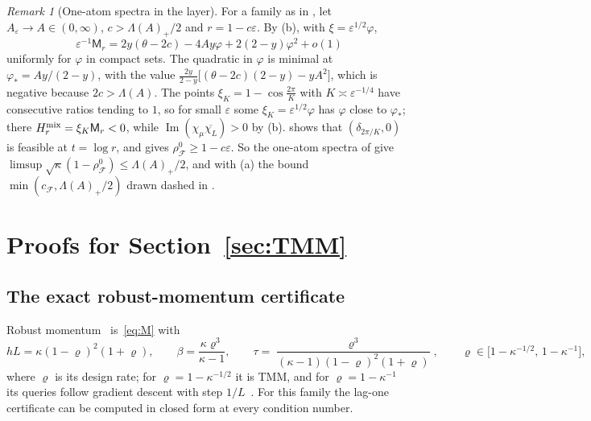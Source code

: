 \documentclass[11pt]{article}
\theoremstyle{definition}
\theoremstyle{remark}
\newtheorem{remark}[theorem]{Remark}
\newcommand{\cF}{\mathcal F}
\newcommand{\Ima}{\operatorname{Im}}
\newcommand{\rhoz}{\rho_{\cF}^{0}}
\newcommand{\cFF}{c_{\cF}}
\begin{document}
\begin{remark}[One-atom spectra in the layer]\label{rem:onelayer}
For a family as in , let \(A_\varepsilon\to A\in(0,\infty)\), \(c>\Lambda(A)_+/2\) and \(r=1-c\varepsilon\).  By (b), with \(\xi=\varepsilon^{1/2}\varphi\),
\[
\varepsilon^{-1}\mathsf M_r=2y(\theta-2c)-4Ay\varphi+2(2-y)\varphi^2+o(1)
\]
uniformly for \(\varphi\) in compact sets.  The quadratic in \(\varphi\) is minimal at \(\varphi_*=Ay/(2-y)\), with the value
\(\frac{2y}{2-y}\bigl[(\theta-2c)(2-y)-yA^2\bigr]\), which is negative because \(2c>\Lambda(A)\).  The points \(\xi_K=1-\cos\frac{2\pi}K\) with
\(K\asymp\varepsilon^{-1/4}\) have consecutive ratios tending to \(1\), so for small \(\varepsilon\) some \(\xi_K=\varepsilon^{1/2}\varphi\) has \(\varphi\) close to
\(\varphi_*\); there \(H^{\rm mix}_r=\xi_K\mathsf M_r<0\), while \(\Ima(\chi_\mu\overline{\chi_L})>0\) by (b).   shows that
\((\delta_{2\pi/K},0)\) is feasible at \(t=\log r\), and  gives \(\rhoz\ge1-c\varepsilon\).  So the one-atom spectra of
 give \(\limsup\sqrt\kappa(1-\rhoz)\le\Lambda(A)_+/2\), and with (a) the bound \(\min(\cFF,\Lambda(A)_+/2)\)
drawn dashed in .
\end{remark}

%
\section{Proofs for Section~\ref{sec:TMM}}
\label{app:corner}
%

\subsection{The exact robust-momentum certificate}
\label{app:robust-certificate}

Robust momentum~\cite{CHVL18} is~\eqref{eq:M} with
\begin{equation}\label{eq:robust}
hL=\kappa(1-\varrho)^2(1+\varrho),\qquad \beta=\frac{\kappa\varrho^3}{\kappa-1},\qquad
\tau=\frac{\varrho^3}{(\kappa-1)(1-\varrho)^2(1+\varrho)},\qquad \varrho\in\bigl[1-\kappa^{-1/2},\,1-\kappa^{-1}\bigr],
\end{equation}
where \(\varrho\) is its design rate; for \(\varrho=1-\kappa^{-1/2}\) it is TMM, and for \(\varrho=1-\kappa^{-1}\) its
queries follow gradient descent with step \(1/L\)~\cite{CHVL18}.  For this family the lag-one certificate can be
computed in closed form at every condition number.
\end{document}
